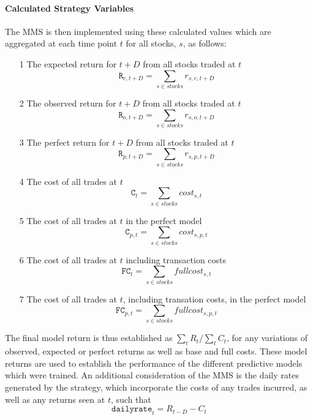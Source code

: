 \documentclass[a4paper,11pt,oneside]{article}
\theoremstyle{plain}
\theoremstyle{definition}
\begin{document}
\hfill\break

\paragraph{Calculated Strategy Variables} The MMS  is then implemented using these calculated values which are aggregated at each time point $t$ for all stocks, $s$, as follows:

\begin{itemize}
	\item [1] The expected return for $t+D$ from all stocks traded at $t$
					\begin{equation}
					\texttt{R}_{e, {t+D}} = \sum_{s \in stocks} r_{s, e, {t+D}}
					\end{equation}
	\item [2] The observed return for $t+D$ from all stocks traded at $t$
					\begin{equation}
					\texttt{R}_{o, {t+D}} = \sum_{s \in stocks} r_{s, o, {t+D}}
					\end{equation}
	\item [3] The perfect return for $t+D$ from all stocks traded at $t$
					\begin{equation}
					\texttt{R}_{p, {t+D}} = \sum_{s \in stocks} r_{s, p, {t+D}}
					\end{equation}
	\item [4] The cost of all trades at $t$
					\begin{equation}
					\texttt{C}_t = \sum_{s \in stocks} cost_{s,t}
					\end{equation}
	\item [5] The cost of all trades at $t$ in the perfect model
					\begin{equation}
					\texttt{C}_{p,t} = \sum_{s \in stocks} cost_{s, p ,t}
					\end{equation}
	\item [6] The cost of all trades at $t$ including transaction costs
					\begin{equation}
					\texttt{FC}_t = \sum_{s \in stocks} fullcost_{s,t}
					\end{equation}
	\item [7] The cost of all trades at $t$, including transation costs, in the perfect model	
					\begin{equation}
					\texttt{FC}_{p,t} = \sum_{s \in stocks} fullcost_{s, p ,t}
					\end{equation}	
\end{itemize}
\hfill\break
The final model return is thus established as $\sum_t{R_t} / \sum_t{C_t} $, for any variations of observed, expected or perfect returns as well as base and full costs. These model returns are used to establish the performance of the different predictive models which were trained.\newline
\hfill\break
An additional consideration of the MMS is the daily rates generated by the strategy, which incorporate the costs of any trades incurred, as well as any returns seen at $t$, such that 
\begin{equation}
\texttt{dailyrate}_t = R_{t-D} - C_t
\end{equation}
\end{document}
